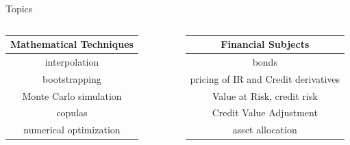 \documentclass{beamer}
\begin{document}
\begin{frame}{Topics}
  \begin{columns}
    \begin{tabular}{|c|}
    	\hline
    	\textbf{Mathematical Techniques}\\
    	\hline\hline
    	interpolation \\
    	\hline
    	bootstrapping\\
    	\hline
    	Monte Carlo simulation\\
    	\hline
    	copulas\\
    	\hline
    	numerical optimization\\
    	\hline
    \end{tabular}
        \begin{tabular}{|c|}
    	\hline
    	\textbf{Financial Subjects}\\
    	\hline\hline
    	bonds\\
    	\hline
    	pricing of IR and Credit derivatives\\
    	\hline
    	Value at Risk, credit risk\\
    	\hline
    	Credit Value Adjustment\\
    	\hline
    	asset allocation\\
    	\hline
    \end{tabular}

\end{columns}
\end{frame}
\end{document}
